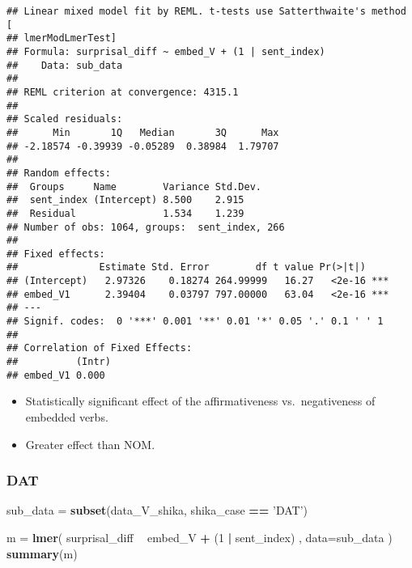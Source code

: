 \documentclass[]{ltjsarticle}
\newenvironment{Shaded}{\begin{snugshade}}{\end{snugshade}}
\newcommand{\KeywordTok}[1]{\textcolor[rgb]{0.13,0.29,0.53}{\textbf{#1}}}
\newcommand{\DataTypeTok}[1]{\textcolor[rgb]{0.13,0.29,0.53}{#1}}
\newcommand{\DecValTok}[1]{\textcolor[rgb]{0.00,0.00,0.81}{#1}}
\newcommand{\StringTok}[1]{\textcolor[rgb]{0.31,0.60,0.02}{#1}}
\newcommand{\OperatorTok}[1]{\textcolor[rgb]{0.81,0.36,0.00}{\textbf{#1}}}
\newcommand{\NormalTok}[1]{#1}
\providecommand{\tightlist}{%
  \setlength{\itemsep}{0pt}\setlength{\parskip}{0pt}}
\begin{document}
\begin{verbatim}
## Linear mixed model fit by REML. t-tests use Satterthwaite's method [
## lmerModLmerTest]
## Formula: surprisal_diff ~ embed_V + (1 | sent_index)
##    Data: sub_data
## 
## REML criterion at convergence: 4315.1
## 
## Scaled residuals: 
##      Min       1Q   Median       3Q      Max 
## -2.18574 -0.39939 -0.05289  0.38984  1.79707 
## 
## Random effects:
##  Groups     Name        Variance Std.Dev.
##  sent_index (Intercept) 8.500    2.915   
##  Residual               1.534    1.239   
## Number of obs: 1064, groups:  sent_index, 266
## 
## Fixed effects:
##              Estimate Std. Error        df t value Pr(>|t|)    
## (Intercept)   2.97326    0.18274 264.99999   16.27   <2e-16 ***
## embed_V1      2.39404    0.03797 797.00000   63.04   <2e-16 ***
## ---
## Signif. codes:  0 '***' 0.001 '**' 0.01 '*' 0.05 '.' 0.1 ' ' 1
## 
## Correlation of Fixed Effects:
##          (Intr)
## embed_V1 0.000
\end{verbatim}

\begin{itemize}
\tightlist
\item
  Statistically significant effect of the affirmativeness
  vs.~negativeness of embedded verbs.
\item
  Greater effect than NOM.
\end{itemize}

\subsubsection{DAT}\label{dat}

\begin{Shaded}
\begin{Highlighting}[]
\NormalTok{sub_data =}\StringTok{ }\KeywordTok{subset}\NormalTok{(data_V_shika, shika_case }\OperatorTok{==}\StringTok{ 'DAT'}\NormalTok{)}

\NormalTok{m =}\StringTok{ }\KeywordTok{lmer}\NormalTok{(}
\NormalTok{        surprisal_diff}
            \OperatorTok{~}\StringTok{ }\NormalTok{embed_V}
                \OperatorTok{+}\StringTok{ }\NormalTok{(}\DecValTok{1} \OperatorTok{|}\StringTok{ }\NormalTok{sent_index)}
\NormalTok{        ,}
        \DataTypeTok{data=}\NormalTok{sub_data}
\NormalTok{        )}
\KeywordTok{summary}\NormalTok{(m)}
\end{Highlighting}
\end{Shaded}
\end{document}
